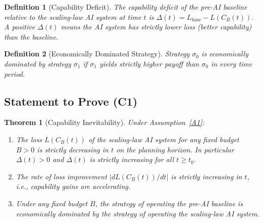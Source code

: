 \documentclass[12pt]{article}
\newtheorem{theorem}{Theorem}
\newtheorem{definition}{Definition}
\begin{document}
\begin{definition}[Capability Deficit]
  The \emph{capability deficit} of the pre-AI baseline relative to the
  scaling-law AI system at time $t$ is
  $\Delta(t) = L_{\mathrm{base}} - L(C_B(t))$.
  A positive $\Delta(t)$ means the AI system has strictly lower loss
  (better capability) than the baseline.
\end{definition}

\begin{definition}[Economically Dominated Strategy]
  Strategy $\sigma_0$ is \emph{economically dominated} by strategy
  $\sigma_1$ if $\sigma_1$ yields strictly higher payoff than $\sigma_0$
  in every time period.
\end{definition}

\subsection*{Statement to Prove (C1)}

\begin{theorem}[Capability Inevitability]\label{thm:C1}
  Under Assumption~\ref{A1}:
  \begin{enumerate}
    \item[(i)] The loss $L(C_B(t))$ of the scaling-law AI system for
      any fixed budget $B > 0$ is strictly decreasing in $t$ on the
      planning horizon.  In particular $\Delta(t) > 0$ and $\Delta(t)$
      is strictly increasing for all $t \geq t_0$.
    \item[(ii)] The rate of loss improvement $|dL(C_B(t))/dt|$ is
      strictly increasing in $t$, i.e., capability gains are accelerating.
    \item[(iii)] Under any fixed budget $B$, the strategy of operating
      the pre-AI baseline is economically dominated by the strategy of
      operating the scaling-law AI system.
  \end{enumerate}
\end{theorem}
\end{document}
